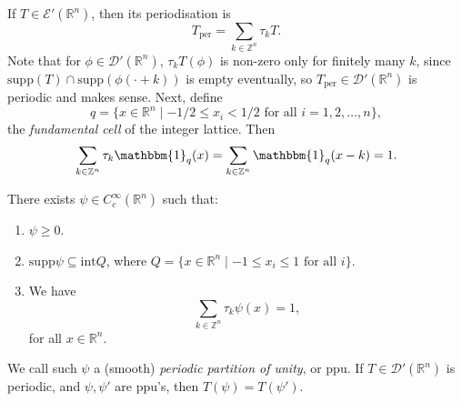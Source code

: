 \documentclass[12pt]{article}
\begin{document}
If $T \in \mathcal{E}'(\mathbb{R}^n)$, then its periodisation is
\[
T_{\mathrm{per}} = \sum_{k \in \mathbb{Z}^n} \tau_k T.
\]
Note that for $\phi \in \mathcal{D}'(\mathbb{R}^n)$, $\tau_k T(\phi)$ is non-zero only for finitely many $k$, since $\mathrm{supp}(T) \cap \mathrm{supp}(\phi(\cdot + k))$ is empty eventually, so $T_{\mathrm{per}} \in \mathcal{D}'(\mathbb{R}^n)$ is periodic and makes sense. Next, define
\[
	q = \{x \in \mathbb{R}^n \mid -1/2 \leq x_i < 1/2 \text{ for all } i = 1, 2, \ldots, n\},
\]
the \emph{fundamental cell} of the integer lattice. Then
\[
\sum_{k \in \mathbb{Z}^n} \tau_k \mathbbm{1}_{q}(x) = \sum_{k \in \mathbb{Z}^n} \mathbbm{1}_{q}(x - k)= 1.
\]

\begin{lemma}
	There exists $\psi \in C^\infty_c(\mathbb{R}^n)$ such that:
	\begin{enumerate}[\normalfont(i)]
		\item $\psi \geq 0$.
		\item $\mathrm{supp} \psi \subseteq \mathrm{int} Q$, where $Q = \{x \in \mathbb{R}^n \mid -1 \leq x_i \leq 1 \text{ for all } i\}$.
		\item We have
			\[
			\sum_{k \in \mathbb{Z}^n} \tau_k \psi(x) = 1,
			\]
			for all $x \in \mathbb{R}^n$.
	\end{enumerate}
	We call such $\psi$ a (smooth) \emph{periodic partition of unity}, or ppu. If $T \in \mathcal{D}'(\mathbb{R}^n)$ is periodic, and $\psi, \psi'$ are ppu's, then $T(\psi) = T(\psi')$.
\end{lemma}
\end{document}
